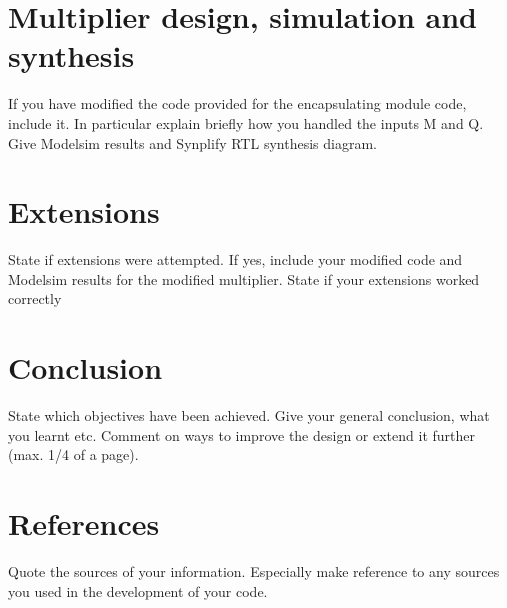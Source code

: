 \documentclass[a4paper,11pt]{article}
\begin{document}
\section{Multiplier design, simulation and synthesis}
If you have modified the code provided for the encapsulating module code, include it. In particular explain briefly how you handled the inputs M and Q.  Give Modelsim results and Synplify RTL synthesis diagram. 

\section{Extensions}
State if extensions were attempted. If yes, include your modified code and Modelsim results for the modified multiplier. State if your extensions worked correctly

\section{Conclusion}
State which objectives have been achieved. Give your general conclusion, what you learnt etc. Comment on ways to improve the design or extend it further  (max. 1/4 of a page).

\section{References}
Quote the sources of your information. Especially make reference to any sources you used in the development of your code. 
  
\end{document}
